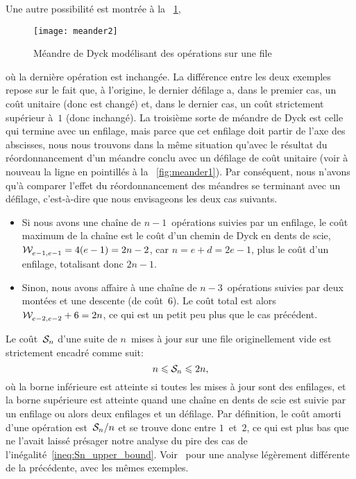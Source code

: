 Une autre possibilité est montrée à la \fig~\ref{fig:meander2},
\begin{figure}
\centering
\texttt{[image: meander2]}
\caption{Méandre de Dyck modélisant des opérations sur une file}
\label{fig:meander2}
\end{figure}
où la dernière opération est inchangée. La différence entre les deux
exemples repose sur le fait que, à l'origine, le dernier défilage a,
dans le premier cas, un coût unitaire (donc est changé) et, dans le
dernier cas, un coût strictement supérieur à~\(1\) (donc inchangé). La
troisième sorte de méandre de Dyck est celle qui termine avec un
enfilage, mais parce que cet enfilage doit partir de l'axe des
abscisses, nous nous trouvons dans la même situation qu'avec le
résultat du réordonnancement d'un méandre conclu avec un défilage de
coût unitaire (voir à nouveau la ligne en pointillés à la
\fig~\ref{fig:meander1}). Par conséquent, nous n'avons qu'à comparer
l'effet du réordonnancement des méandres se terminant avec un
défilage, c'est-à-dire que nous envisageons les deux cas suivants.
\begin{itemize}

\item Si nous avons une chaîne de \(n-1\)~opérations suivies par un
  enfilage, le coût maximum de la chaîne est le coût d'un chemin de
  Dyck en dents de scie, \(\mathcal{W}_{e-1,e-1}^{}=4(e-1)=2n-2\), car
  \(n=e+d=2e-1\), plus le coût d'un enfilage, totalisant donc
  \(2n-1\).

  \item Sinon, nous avons affaire à une chaîne de \(n-3\)~opérations
  suivies par deux montées et une descente (de coût~\(6\)). Le coût
  total est alors \(\mathcal{W}_{e-2,e-2}^{}+6=2n\), ce qui est un petit peu plus
  que le cas précédent.

\end{itemize}


Le coût~\(\mathcal{S}_{n}\) d'une suite de \(n\)~mises à jour sur une file
originellement vide est strictement encadré comme
suit:
\begin{equation*}
n \leqslant \mathcal{S}_{n} \leqslant 2n,
\end{equation*}
où la borne inférieure est atteinte si toutes les mises à jour sont
des enfilages, et la borne supérieure est atteinte quand une chaîne en
dents de scie est suivie par un enfilage ou alors deux enfilages et un
défilage. Par définition, le coût amorti d'une opération
est~\(\mathcal{S}_{n}/n\) et se trouve donc entre \(1\)~et~\(2\), ce qui est
plus bas que ne l'avait laissé présager notre analyse du pire des cas
de l'inégalité~\eqref{ineq:Sn_upper_bound}. Voir~\citep{Rinderknecht_2011}
pour une analyse légèrement différente de la précédente, avec les
mêmes exemples.


